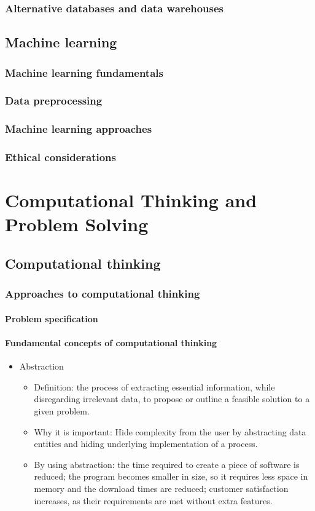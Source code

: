 \documentclass[a4paper,12pt]{article}
\begin{document}
\subsubsection{Alternative databases and data warehouses}
\subsection{Machine learning}
\subsubsection{Machine learning fundamentals}
\subsubsection{Data preprocessing}
\subsubsection{Machine learning approaches}
\subsubsection{Ethical considerations}

\newpage
\section{Computational Thinking and Problem Solving}
\subsection{Computational thinking}
\subsubsection{Approaches to computational thinking}
\paragraph{Problem specification}
\paragraph{Fundamental concepts of computational thinking}
\begin{itemize}
    \item Abstraction
    \begin{itemize}
        \item Definition: the process of extracting essential information, while disregarding irrelevant data, to propose or outline a feasible solution to a given problem.
        \item Why it is important: Hide complexity from the user by abstracting data entities and hiding underlying implementation of a process.
        \item By using abstraction: the time required to create a piece of software is reduced; the program becomes smaller in size, so it requires less space in memory and the download times are reduced; customer satisfaction increases, as their requirements are met without extra features. 
    \end{itemize}
\end{itemize}
\end{document}

